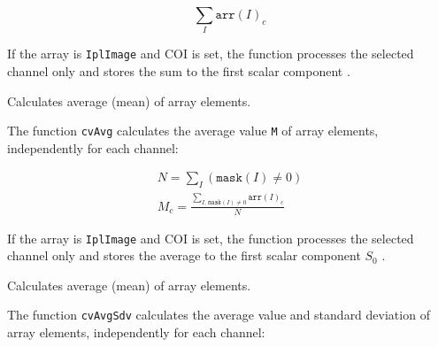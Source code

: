 \[ \sum_I \texttt{arr}(I)_c \]

If the array is \texttt{IplImage} and COI is set, the function processes the selected channel only and stores the sum to the first scalar component
.


\label{Avg}

Calculates average (mean) of array elements.


\begin{description}
\end{description}


The function \texttt{cvAvg} calculates the average value \texttt{M} of array elements, independently for each channel:

\[
\begin{array}{l}
N = \sum_I (\texttt{mask}(I) \ne 0)\\
M_c = \frac{\sum_{ I, \, \texttt{mask}(I) \ne 0} \texttt{arr}(I)_c}{N}
\end{array}
\]

If the array is \texttt{IplImage} and COI is set, the function processes the selected channel only and stores the average to the first scalar component $ S_0 $ .

\label{AvgSdv}

Calculates average (mean) of array elements.


\begin{description}
\ifC
{}
\fi
{}
\ifPython
{}
\fi

\end{description}

The function \texttt{cvAvgSdv} calculates the average value and standard deviation of array elements, independently for each channel:

